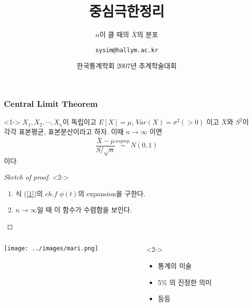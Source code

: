 \documentclass{beamer}
\title{중심극한정리}
\subtitle{$n$이 클 때의 $\bar{X}$의 분포}
\author[심송용]{\texttt{sysim@hallym.ac.kr}}
\date[\today]{한국통계학회 2007년 추계학술대회}
\institute{한림대 통계학과}
\begin{document}

\begin{frame}
\titlepage
\end{frame}

\begin{frame}
\frametitle{Central Limit Theorem}
\begin{theorem}<1->
$X_1, X_2, \cdots, X_n$이 독립이고 $E[X] = \mu$, $Var(X)=\sigma^2 (>0)$ 이고 $\bar{X}$와 $S^2$이 각각 표본평균, 표본분산이라고 하자. 이때 $n \rightarrow \infty$ 이면 
\begin{equation} \label{1}
\frac{\bar{X} - \mu}{S/ \sqrt{n}} \stackrel{asymp.}{\sim}N(0,1)
\end{equation}
이다.
\end{theorem}

\begin{proof}[Sketch of proof]<2->
\begin{enumerate}
\item<3-> 식 (\ref{1})의 $ch.f$ $\phi(t)$의 expansion을 구한다.
\item<4-> $n \rightarrow \infty$일 때 이 함수가 수렴함을 보인다.
\end{enumerate}
\end{proof}
\end{frame}

\begin{frame}
\begin{columns}[T]
\begin{column}{3in}
\centerline{
\texttt{[image: ../images/mari.png]}}
\end{column}
\begin{column}{8cm}<2->
\begin{itemize}
\item<1-> 통계의 미술
\item<2-> 5\% 의 진정한 의미
\item<3> 등등
\end{itemize}
\end{column}
\end{columns}
\end{frame}

\end{document}
